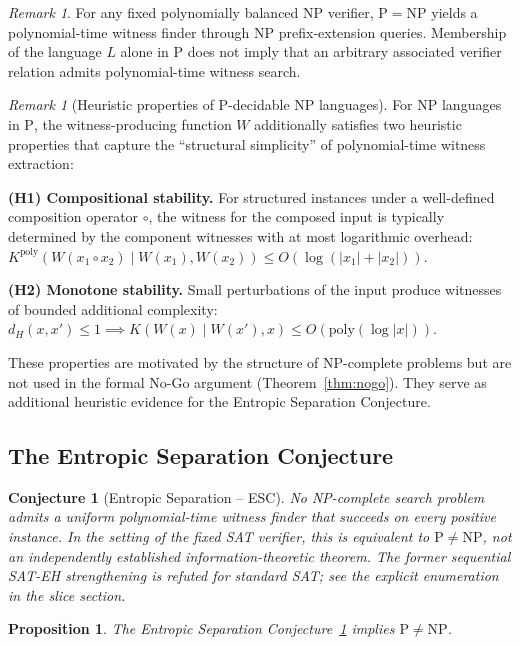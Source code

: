 \documentclass[aps,prd,twocolumn,superscriptaddress,nofootinbib]{revtex4-2}
\newtheorem{proposition}[theorem]{Proposition}
\newtheorem{conjecture}[theorem]{Conjecture}
\theoremstyle{definition}
\theoremstyle{remark}
\newtheorem{remark}[theorem]{Remark}
\DeclareMathOperator{\poly}{poly}
\newcommand{\NP}{\mathrm{NP}}
\newcommand{\PP}{\mathrm{P}}
\begin{document}
\begin{remark}
For any fixed polynomially balanced NP verifier, $\PP=\NP$ yields a polynomial-time witness finder through NP prefix-extension queries. Membership of the language $L$ alone in $\PP$ does not imply that an arbitrary associated verifier relation admits polynomial-time witness search.
\end{remark}

\begin{remark}[Heuristic properties of P-decidable NP languages]
\label{rem:heuristic-ap}
For NP languages in $\PP$, the witness-producing function $W$ additionally satisfies two heuristic properties that capture the ``structural simplicity'' of polynomial-time witness extraction:

\textbf{(H1) Compositional stability.} For structured instances under a well-defined composition operator $\circ$, the witness for the composed input is typically determined by the component witnesses with at most logarithmic overhead: $K^{\poly}(W(x_1 \circ x_2) \mid W(x_1), W(x_2)) \leq O(\log(|x_1|+|x_2|))$.

\textbf{(H2) Monotone stability.} Small perturbations of the input produce witnesses of bounded additional complexity: $d_H(x,x') \leq 1 \implies K(W(x) \mid W(x'), x) \leq O(\mathrm{poly}(\log|x|))$.

These properties are motivated by the structure of $\NP$-complete problems but are not used in the formal No-Go argument (Theorem~\ref{thm:nogo}). They serve as additional heuristic evidence for the Entropic Separation Conjecture.
\end{remark}

\subsection{The Entropic Separation Conjecture}

\begin{conjecture}[Entropic Separation -- ESC]
\label{conj:entropic}
No NP-complete search problem admits a uniform polynomial-time witness
finder that succeeds on every positive instance. In the setting of
the fixed SAT verifier, this is equivalent to $\PP\ne\NP$,
not an independently established information-theoretic theorem.
The former sequential SAT-EH strengthening is refuted for standard SAT;
see the explicit enumeration in the slice section.
\end{conjecture}

\begin{proposition}
\label{prop:equiv}
The Entropic Separation Conjecture~\ref{conj:entropic} implies $\PP \neq \NP$.
\end{proposition}
\end{document}
